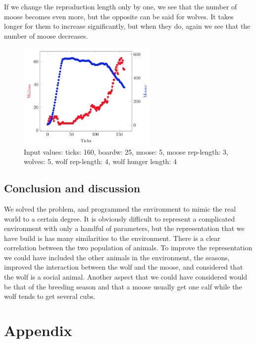 \documentclass[a4paper]{report}
\begin{document}
If we change the reproduction length only by one, we see that the number of moose becomes even more, but the opposite can be said for wolves. It takes longer for them to increase significantly, but when they do, again we see that the number of moose decreases. 


\begin{figure}[H]
\centering
\includegraphics[width=0.60\textwidth]{Experiments/sim_rep_c2}
\caption{Input values: ticks: 160, boardw: 25, moose: 5, moose rep-length: 3, wolves: 5, wolf rep-length: 4, wolf hunger length: 4}
\end{figure}

\subsection*{Conclusion and discussion}
We solved the problem, and programmed the environment to mimic the real world to a certain degree. It is obviously difficult to represent a complicated environment with only a handful of parameters, but the representation that we have build is has many similarities to the environment. There is a clear correlation between the two population of animals.
To improve the representation we could have included the other animals in the environment, the seasons, improved the interaction between the wolf and the moose, and considered that the wolf is a social animal. Another aspect that we could have considered would be that of the breeding season and that a moose usually get one calf while the wolf tends to get several cubs.

\newpage
\section*{Appendix}
\end{document}
